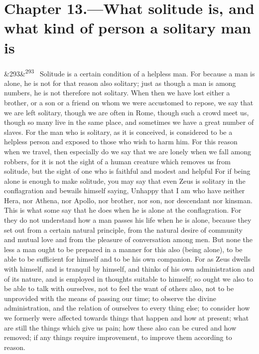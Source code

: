 \documentclass[12pt]{article}
\newcommand{\para}[1][]{\par\noindent\ifx&#1&\else\textsuperscript{\footnotesize #1}~\fi}
\begin{document}
\section*{Chapter 13.---What solitude is, and what kind of person a solitary man is}

\para[293] Solitude is a certain condition of a helpless man. For because a man is alone, he is not for that reason also solitary; just as though a man is among numbers, he is not therefore not solitary. When then we have lost either a brother, or a son or a friend on whom we were accustomed to repose, we say that we are left solitary, though we are often in Rome, though such a crowd meet us, though so many live in the same place, and sometimes we have a great number of slaves. For the man who is solitary, as it is conceived, is considered to be a helpless person and exposed to those who wish to harm him. For this reason when we travel, then especially do we say that we are lonely when we fall among robbers, for it is not the sight of a human creature which removes us from solitude, but the sight of one who is faithful and modest and helpful For if being alone is enough to make solitude, you may say that even Zeus is solitary in the conflagration and bewails himself saying, Unhappy that I am who have neither Hera, nor Athena, nor Apollo, nor brother, nor son, nor descendant nor kinsman. This is what some say that he does when he is alone at the conflagration. For they do not understand how a man passes his life when he is alone, because they set out from a certain natural principle, from the natural desire of community and mutual love and from the pleasure of conversation among men. But none the less a man ought to be prepared in a manner for this also (being alone), to be able to be sufficient for himself and to be his own companion. For as Zeus dwells with himself, and is tranquil by himself, and thinks of his own administration and of its nature, and is employed in thoughts suitable to himself; so ought we also to be able to talk with ourselves, not to feel the want of others also, not to be unprovided with the means of passing our time; to observe the divine administration, and the relation of ourselves to every thing else; to consider how we formerly were affected towards things that happen and how at present; what are still the things which give us pain; how these also can be cured and how removed; if any things require improvement, to improve them according to reason.
\end{document}
